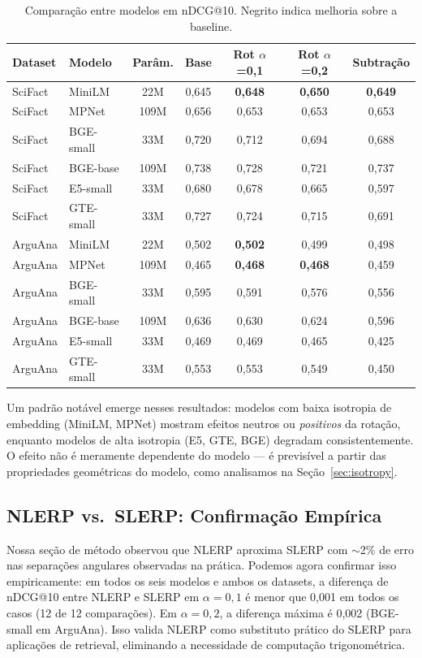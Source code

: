 \documentclass{article}
\begin{document}
\begin{table}[ht]
\centering
\caption{Comparação entre modelos em nDCG@10. Negrito indica melhoria sobre a baseline.}
\label{tab:cross_model}
\small
\begin{tabular}{llccccc}
\toprule
Dataset & Modelo & Parâm. & Base & Rot $\alpha$=0,1 & Rot $\alpha$=0,2 & Subtração \\
\midrule
SciFact & MiniLM & 22M & 0,645 & \textbf{0,648} & \textbf{0,650} & \textbf{0,649} \\
SciFact & MPNet & 109M & 0,656 & 0,653 & 0,653 & 0,653 \\
SciFact & BGE-small & 33M & 0,720 & 0,712 & 0,694 & 0,688 \\
SciFact & BGE-base & 109M & 0,738 & 0,728 & 0,721 & 0,737 \\
SciFact & E5-small & 33M & 0,680 & 0,678 & 0,665 & 0,597 \\
SciFact & GTE-small & 33M & 0,727 & 0,724 & 0,715 & 0,691 \\
\addlinespace
ArguAna & MiniLM & 22M & 0,502 & \textbf{0,502} & 0,499 & 0,498 \\
ArguAna & MPNet & 109M & 0,465 & \textbf{0,468} & \textbf{0,468} & 0,459 \\
ArguAna & BGE-small & 33M & 0,595 & 0,591 & 0,576 & 0,556 \\
ArguAna & BGE-base & 109M & 0,636 & 0,630 & 0,624 & 0,596 \\
ArguAna & E5-small & 33M & 0,469 & 0,469 & 0,465 & 0,425 \\
ArguAna & GTE-small & 33M & 0,553 & 0,553 & 0,549 & 0,450 \\
\bottomrule
\end{tabular}
\end{table}

Um padrão notável emerge nesses resultados: modelos com baixa isotropia de embedding (MiniLM, MPNet) mostram efeitos neutros ou \emph{positivos} da rotação, enquanto modelos de alta isotropia (E5, GTE, BGE) degradam consistentemente. O efeito não é meramente dependente do modelo --- é previsível a partir das propriedades geométricas do modelo, como analisamos na Seção~\ref{sec:isotropy}.

\subsection{NLERP vs.\ SLERP: Confirmação Empírica}

Nossa seção de método observou que NLERP aproxima SLERP com $\sim$2\% de erro nas separações angulares observadas na prática. Podemos agora confirmar isso empiricamente: em todos os seis modelos e ambos os datasets, a diferença de nDCG@10 entre NLERP e SLERP em $\alpha = 0{,}1$ é menor que 0,001 em todos os casos (12 de 12 comparações). Em $\alpha = 0{,}2$, a diferença máxima é 0,002 (BGE-small em ArguAna). Isso valida NLERP como substituto prático do SLERP para aplicações de retrieval, eliminando a necessidade de computação trigonométrica.
\end{document}
